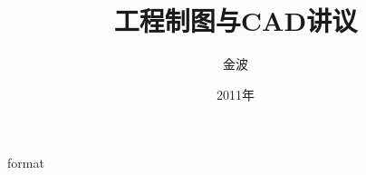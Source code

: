 \documentclass[12pt,twoside]{book}
\begin{document}
\begin{CJK}{UTF8}{song}
 {format}
\title{工程制图与CAD讲议}
\author{金波}
\date{2011年}
\maketitle
\CJKtilde
\frontmatter
\tableofcontents
\mainmatter
\graphicspath{{pdf/}}





\newpage
\end{CJK}
\end{document}
